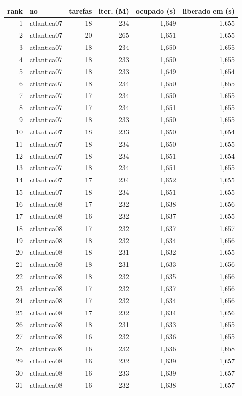 \begin{tabular}{rlrrrr}
\toprule
rank & no & tarefas & iter. (M) & ocupado (s) & liberado em (s) \\
\midrule
1 & atlantica07 & 18 & 234 & 1,649 & 1,655 \\
2 & atlantica07 & 20 & 265 & 1,651 & 1,655 \\
3 & atlantica07 & 18 & 234 & 1,650 & 1,655 \\
4 & atlantica07 & 18 & 233 & 1,650 & 1,655 \\
5 & atlantica07 & 18 & 233 & 1,649 & 1,654 \\
6 & atlantica07 & 18 & 234 & 1,650 & 1,655 \\
7 & atlantica07 & 17 & 234 & 1,650 & 1,655 \\
8 & atlantica07 & 17 & 234 & 1,651 & 1,655 \\
9 & atlantica07 & 18 & 233 & 1,650 & 1,655 \\
10 & atlantica07 & 18 & 233 & 1,650 & 1,654 \\
11 & atlantica07 & 18 & 234 & 1,650 & 1,655 \\
12 & atlantica07 & 18 & 234 & 1,651 & 1,654 \\
13 & atlantica07 & 18 & 234 & 1,651 & 1,655 \\
14 & atlantica07 & 17 & 234 & 1,652 & 1,655 \\
15 & atlantica07 & 18 & 234 & 1,651 & 1,655 \\
16 & atlantica08 & 17 & 232 & 1,638 & 1,656 \\
17 & atlantica08 & 16 & 232 & 1,637 & 1,655 \\
18 & atlantica08 & 17 & 232 & 1,637 & 1,657 \\
19 & atlantica08 & 18 & 232 & 1,634 & 1,656 \\
20 & atlantica08 & 18 & 231 & 1,632 & 1,655 \\
21 & atlantica08 & 18 & 231 & 1,633 & 1,656 \\
22 & atlantica08 & 18 & 232 & 1,635 & 1,656 \\
23 & atlantica08 & 17 & 232 & 1,637 & 1,656 \\
24 & atlantica08 & 17 & 232 & 1,634 & 1,656 \\
25 & atlantica08 & 17 & 232 & 1,634 & 1,656 \\
26 & atlantica08 & 18 & 231 & 1,633 & 1,655 \\
27 & atlantica08 & 16 & 232 & 1,636 & 1,655 \\
28 & atlantica08 & 16 & 232 & 1,636 & 1,658 \\
29 & atlantica08 & 16 & 232 & 1,639 & 1,657 \\
30 & atlantica08 & 16 & 233 & 1,639 & 1,657 \\
31 & atlantica08 & 16 & 232 & 1,638 & 1,657 \\
\bottomrule
\end{tabular}
